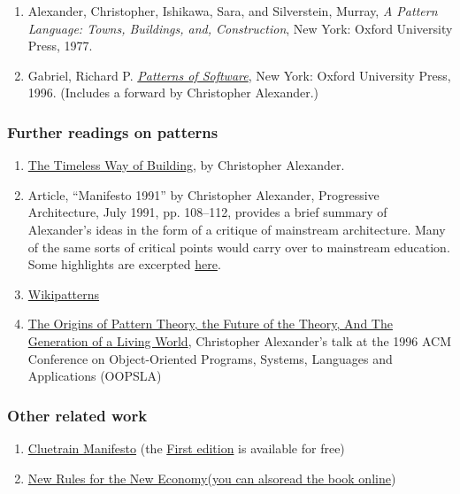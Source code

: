 \begin{enumerate}
\item
  Alexander, Christopher, Ishikawa, Sara, and Silverstein, Murray,
  \emph{A Pattern Language: Towns, Buildings, and, Construction}, New
  York: Oxford University Press, 1977.
\item
  Gabriel, Richard P.
  \emph{\href{http://dreamsongs.net/Files/PatternsOfSoftware.pdf}{Patterns
  of Software}}, New York: Oxford University Press, 1996. (Includes a
  forward by Christopher Alexander.)
\end{enumerate}
\subsubsection{Further readings on patterns}

\begin{enumerate}
\item
  \href{http://en.wikipedia.org/wiki/The\_Timeless\_Way\_of\_Building}{The
  Timeless Way of Building}, by Christopher Alexander.
\item
  Article, ``Manifesto 1991'' by Christopher Alexander, Progressive
  Architecture, July 1991, pp. 108--112, provides a brief summary of
  Alexander's ideas in the form of a critique of mainstream
  architecture. Many of the same sorts of critical points would carry
  over to mainstream education. Some highlights are excerpted
  \href{https://plus.google.com/u/0/108598104736826154120/posts/agWYcqPhqSN}{here}.
\item
  \href{http://www.wikipatterns.com/display/wikipatterns/About}{Wikipatterns}
\item
  \href{http://www.patternlanguage.com/archive/ieee/ieeetext.htm}{The
  Origins of Pattern Theory, the Future of the Theory, And The
  Generation of a Living World}, Christopher Alexander's talk at the
  1996 ACM Conference on Object-Oriented Programs, Systems, Languages
  and Applications (OOPSLA)
\end{enumerate}
\subsubsection{Other related work}

\begin{enumerate}
\item
  \href{http://www.cluetrain.com}{Cluetrain Manifesto} (the
  \href{http://www.cluetrain.com/book/index.html}{First edition} is
  available for free)
\item
  \href{http://www.kk.org/newrules/contents.php}{New Rules for the New
  Economy}\href{http://www.kk.org/newrules/contents.php}{(you can
  also}\href{http://www.kk.org/newrules/contents.php}{read the book
  online})
\end{enumerate}
